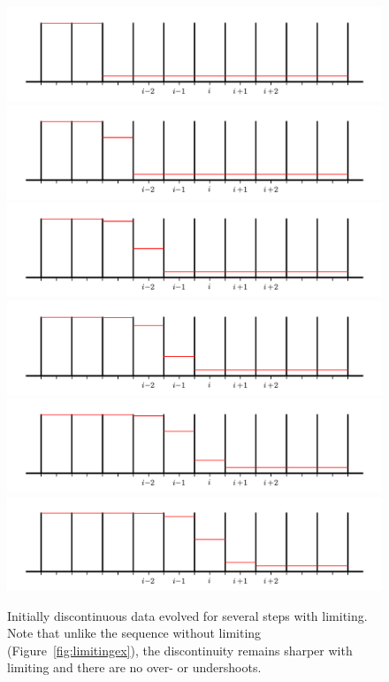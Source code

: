 \begin{figure}[h]
\centering
\includegraphics[width=0.75\linewidth]{rea-start_001} \\
\includegraphics[width=0.75\linewidth]{rea-start_002} \\
\includegraphics[width=0.75\linewidth]{rea-start_003} \\
\includegraphics[width=0.75\linewidth]{rea-start_004} \\
\includegraphics[width=0.75\linewidth]{rea-start_005} \\
\includegraphics[width=0.75\linewidth]{rea-start_006}
\caption[The effect of limiters on initially discontinuous
  data]{\label{fig:limitingexb}Initially discontinuous data evolved
  for several steps with limiting.  Note that unlike the sequence
  without limiting (Figure~\ref{fig:limitingex}), the
  discontinuity remains sharper with limiting and there are no over-
  or undershoots.}
\end{figure}

